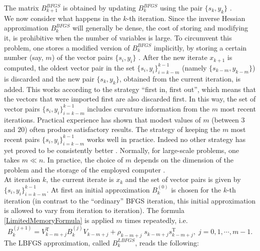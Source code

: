 The matrix $B^{BFGS}_{k+1}$ is obtained by updating $B^{BFGS}_k$ using the pair $\{ s_k, y_k\}$ \cite[p.~293]{SunYuan:2006}. \\
We now consider what happens in the $k$-th iteration. Since the inverse Hessian approximation $B^{BFGS}_k$ will generally be dense, the cost of storing and modifying it, is prohibitive when the number of variables is large. To circumvent this problem, one stores a modified version of $B^{BFGS}_k$ implicitly, by storing a certain number (say, $m$) of the vector pairs $\{ s_i, y_i\}$ \cite[p.~177]{NocedalWright:2006}. After the new iterate $x_{k+1}$ is computed, the oldest vector pair in the set $\{ s_i, y_i\}_{i=k-m}^{k-1}$ (namely $\{ s_{k-m}, y_{k-m}\}$) is discarded and the new pair $\{ s_k, y_k\}$, obtained from the current iteration, is added. This works according to the strategy “first in, first out”, which means that the vectors that were imported first are also discarded first. In this way, the set of vector pairs $\{ s_i, y_i\}_{i=k-m}^{k-1}$ includes curvature information from the $m$ most recent iterations. Practical experience has shown that modest values of $m$ (between $3$ and $20$) often produce satisfactory results. The strategy of keeping the $m$ most recent pairs $\{ s_i, y_i\}_{i=k-m}^{k-1}$ works well in practice. Indeed no other strategy has yet proved to be consistently better \cite[p.~179]{NocedalWright:2006}. Normally, for large-scale problems, one takes $m \ll n$. In practice, the choice of $m$ depends on the dimension of the problem and the storage of the employed computer \cite[p.~295]{SunYuan:2006}. \\
At iteration $k$, the current iterate is $x_k$ and the set of vector pairs is given by $\{ s_i, y_i\}_{i=k-m}^{k-1}$. At first an initial approximation $B^{(0)}_k$ is chosen for the $k$-th iteration (in contrast to the “ordinary” BFGS iteration, this initial approximation is allowed to vary from iteration to iteration). The formula \cref{LimitedMemoryFormula} is applied $m$ times repeatedly, i.e.
\begin{equation*}
    B^{(j+1)}_k = V^{\mathrm{T}}_{k-m+j} B^{(j)}_k V_{k-m+j} + \rho_{k-m+j} \; s_{k-m+j} s_{k-m+j}^{\mathrm{T}}, \; j = 0,1, \cdots, m-1.
\end{equation*}
The LBFGS approximation, called $B^{LBFGS}_k$, reads the following:
